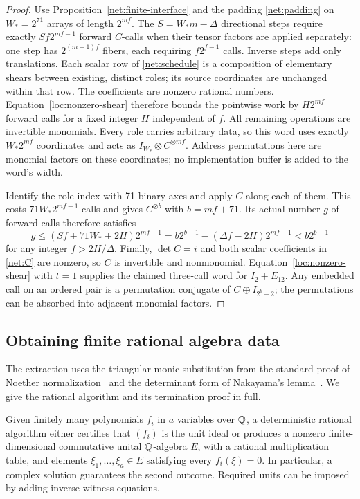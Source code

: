 \begin{proof}
Use Proposition~\ref{net:finite-interface} and the padding
\eqref{net:padding} on $W_*=2^{71}$ arrays of length $2^{mf}$.
The $S=W_*m-\Delta$ directional steps require exactly
$Sf2^{mf-1}$ forward $C$-calls when their tensor factors are
applied separately: one step has $2^{(m-1)f}$ fibers, each requiring
$f2^{f-1}$ calls. Inverse steps add only translations.
Each scalar row of \eqref{net:schedule} is a composition of elementary
shears between existing, distinct roles; its source coordinates are
unchanged within that row. The coefficients are nonzero rational
numbers. Equation~\eqref{loc:nonzero-shear} therefore bounds the
pointwise work by $H2^{mf}$ forward calls for a fixed integer $H$
independent of $f$. All remaining operations are invertible monomials.
Every role carries arbitrary data, so this word uses exactly
$W_*2^{mf}$ coordinates and acts as
$I_{W_*}\otimes C^{\otimes mf}$. Address permutations here are
monomial factors on these coordinates; no implementation buffer is
added to the word's width.

Identify the role index with 71 binary axes and apply $C$ along
each of them. This costs $71W_*2^{mf-1}$ calls and gives
$C^{\otimes b}$ with $b=mf+71$. Its actual number $g$ of forward calls
therefore satisfies
\[
 g\le (Sf+71W_*+2H)2^{mf-1}
   =b2^{b-1}-(\Delta f-2H)2^{mf-1}<b2^{b-1}
\]
for any integer $f>2H/\Delta$.
Finally, $\det C=i$ and both scalar coefficients in \eqref{net:C} are
nonzero, so $C$ is invertible and nonmonomial.
Equation~\eqref{loc:nonzero-shear} with $t=1$ supplies the claimed
three-call word for $I_2+E_{12}$. Any embedded call on an ordered pair
is a permutation conjugate of $C\oplus I_{2^b-2}$; the permutations
can be absorbed into adjacent monomial factors.
\end{proof}

\subsection{Obtaining finite rational algebra data}

The extraction uses the triangular monic substitution from the standard
proof of Noether normalization~\cite[Tags 051M, 051N, and 00OX]{stacksNormalization}
and the determinant form of Nakayama's lemma~\cite{stacksNakayama}.
We give the rational algorithm and its termination proof in full.

\begin{lemma}\label{syn:extraction}
Given finitely many polynomials $f_i$ in $a$ variables over $\mathbb Q$, a
deterministic rational algorithm either certifies that $(f_i)$ is the
unit ideal or produces a nonzero finite-dimensional commutative unital
$\mathbb Q$-algebra $E$, with a rational multiplication table, and elements
$\xi_1,\ldots,\xi_a\in E$ satisfying every $f_i(\xi)=0$.
In particular, a complex solution guarantees the second outcome.
Required units can be imposed by adding inverse-witness equations.
\end{lemma}


